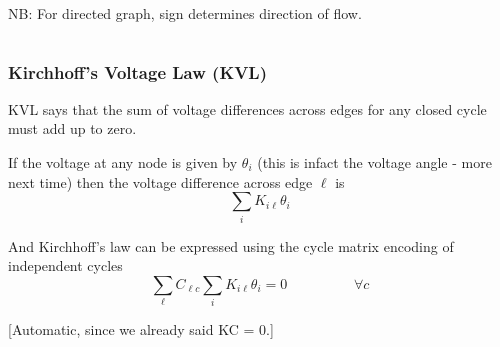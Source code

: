 \documentclass[10pt,aspectratio=169,dvipsnames]{beamer}
\begin{document}
\begin{frame}
\begin{columns}
    \centering

  \raggedright
  NB: For directed graph, sign determines direction of flow.

  \end{columns}
\end{frame}



\begin{frame}
  \frametitle{Kirchhoff's Voltage Law (KVL)}

  KVL says that the sum of voltage differences across edges for any
  closed cycle must add up to zero.

  If the voltage at any node is given by $\theta_i$ (this is infact
  the voltage \alert{angle} - more next time) then the voltage difference across edge $\ell$ is
  \begin{equation*}
    \sum_i K_{i\ell} \theta_i
  \end{equation*}

  And Kirchhoff's law can be expressed using the cycle matrix encoding of independent cycles
  \begin{equation*}
    \sum_\ell C_{\ell c} \sum_i K_{i\ell} \theta_i = 0 \hspace{2cm} \forall c
  \end{equation*}

  [Automatic, since we already said KC = 0.]


\end{frame}
\end{document}
